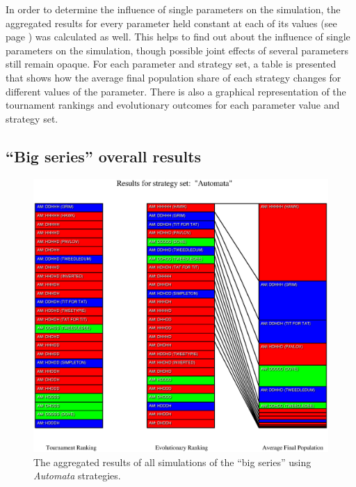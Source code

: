 In order to determine the influence of single parameters on the simulation, the
aggregated results for every parameter held constant at each of its values (see
page \pageref{seriesParameters}) was calculated as well. This helps to
find out about the influence of single parameters on the simulation, though
possible joint effects of several parameters still remain opaque. For each
parameter and strategy set, a table is presented that shows how the average
final population share of each strategy changes for different values of the
parameter. There is also a graphical representation of the tournament rankings
and evolutionary outcomes for each parameter value and strategy set.

\newpage
\subsection{``Big series'' overall results}
\label{BigSeriesResults}



\newpage


\begin{figure}
\begin{center}
\includegraphics[width=20cm]{tables/Automata_overall.eps}
\caption{\label{Automata_Overall} The aggregated results of all simulations
of the ``big series'' using {\em Automata} strategies.}
\end{center}
\end{figure}


